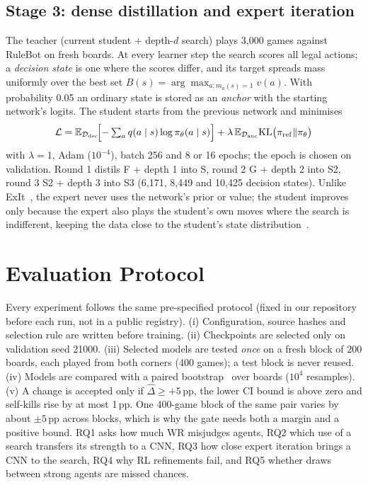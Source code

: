 \documentclass[conference]{IEEEtran}
\newcommand{\pp}{\,pp}
\begin{document}
\subsection{Stage 3: dense distillation and expert iteration}
The teacher (current student + depth-$d$ search) plays 3{,}000 games against RuleBot on fresh boards. At every learner step the search scores all legal actions; a \emph{decision state} is one where the scores differ, and its target spreads mass uniformly over the best set $B(s)=\arg\max_{a:m_a(s)=1}v(a)$. With probability 0.05 an ordinary state is stored as an \emph{anchor} with the starting network's logits. The student starts from the previous network and minimises
\begin{equation}
\mathcal{L}=\mathbb{E}_{\mathcal{D}_{\mathrm{dec}}}\!\Bigl[-\textstyle\sum_a q(a\mid s)\log\pi_\theta(a\mid s)\Bigr]+\lambda\,\mathbb{E}_{\mathcal{D}_{\mathrm{anc}}}\mathrm{KL}\bigl(\pi_{\mathrm{ref}}\Vert\pi_\theta\bigr)
\end{equation}
with $\lambda=1$, Adam ($10^{-4}$), batch 256 and 8 or 16 epochs; the epoch is chosen on validation. Round 1 distils F + depth 1 into S, round 2 G + depth 2 into S2, round 3 S2 + depth 3 into S3 (6{,}171, 8{,}449 and 10{,}425 decision states). Unlike ExIt~\cite{anthony2017exit}, the expert never uses the network's prior or value; the student improves only because the expert also plays the student's own moves where the search is indifferent, keeping the data close to the student's state distribution~\cite{ross2011dagger}.

\section{Evaluation Protocol}
\label{sec:protocol}

Every experiment follows the same pre-specified protocol (fixed in our repository before each run, not in a public registry). (i) Configuration, source hashes and selection rule are written before training. (ii) Checkpoints are selected only on validation seed 21000. (iii) Selected models are tested \emph{once} on a fresh block of 200 boards, each played from both corners (400 games); a test block is never reused. (iv) Models are compared with a paired bootstrap~\cite{efron1979bootstrap} over boards ($10^4$ resamples). (v) A change is accepted only if $\hat\Delta\ge+5$\pp{}, the lower CI bound is above zero and self-kills rise by at most 1\pp{}. One 400-game block of the same pair varies by about $\pm5$\pp{} across blocks, which is why the gate needs both a margin and a positive bound. RQ1 asks how much WR misjudges agents, RQ2 which use of a search transfers its strength to a CNN, RQ3 how close expert iteration brings a CNN to the search, RQ4 why RL refinements fail, and RQ5 whether draws between strong agents are missed chances.
\end{document}
